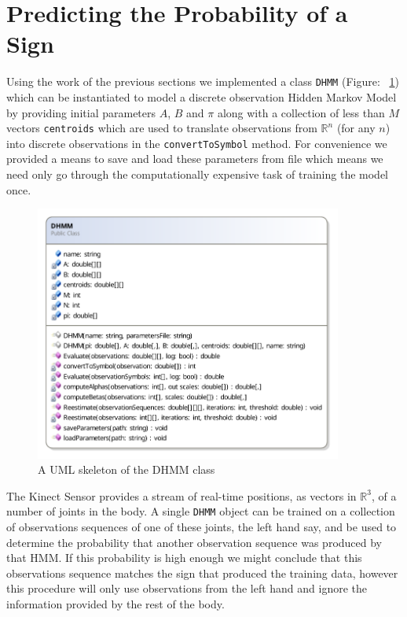 \section{Predicting the Probability of a Sign}
Using the work of the previous sections we implemented a class \verb|DHMM| (Figure: ~\ref{fig:dhmmdiag}) which can be instantiated to model a discrete observation Hidden Markov Model by providing initial parameters $A$, $B$ and $\pi$ along with a collection of less than $M$ vectors \verb|centroids| which are used to translate observations from $\mathbb{R}^n$ (for any $n$) into discrete observations in the \verb|convertToSymbol| method. For convenience we provided a means to save and load these parameters from file which means we need only go through the computationally expensive task of training the model once.

\begin{figure}[h!]
        \centering
        \includegraphics[width=0.9\textwidth]{ThesisFigs/DHMMDiag}
        \caption{A UML skeleton of the DHMM class}\label{fig:dhmmdiag}
\end{figure}

The Kinect Sensor provides a stream of real-time positions, as vectors in $\mathbb{R}^3$, of a number of joints in the body. A single \verb|DHMM| object can be trained on a collection of observations sequences of one of these joints, the left hand say, and be used to determine the probability that another observation sequence was produced by that HMM. If this probability is high enough we might conclude that this observations sequence matches the sign that produced the training data, however this procedure will only use observations from the left hand and ignore the information provided by the rest of the body.

